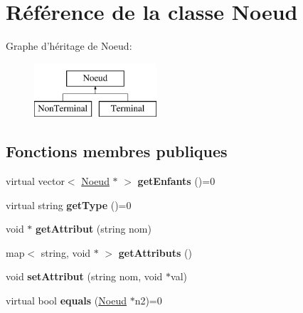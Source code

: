 \hypertarget{class_noeud}{\section{Référence de la classe Noeud}
\label{class_noeud}
}
Graphe d'héritage de Noeud\-:\begin{figure}[H]
\begin{center}
\leavevmode
\includegraphics[height=2.000000cm]{class_noeud}
\end{center}
\end{figure}
\subsection*{Fonctions membres publiques}
\begin{DoxyCompactItemize}
\item 
\hypertarget{class_noeud_ab9d96398e3e1c4767c83110463d130df}{virtual vector$<$ \hyperlink{class_noeud}{Noeud} $\ast$ $>$ {\bfseries get\-Enfants} ()=0}\label{class_noeud_ab9d96398e3e1c4767c83110463d130df}

\item 
\hypertarget{class_noeud_a23ab9345dad17e61c1891a8e5660df60}{virtual string {\bfseries get\-Type} ()=0}\label{class_noeud_a23ab9345dad17e61c1891a8e5660df60}

\item 
\hypertarget{class_noeud_ac36be22327cdf8872e8f61ed0d14d16b}{void $\ast$ {\bfseries get\-Attribut} (string nom)}\label{class_noeud_ac36be22327cdf8872e8f61ed0d14d16b}

\item 
\hypertarget{class_noeud_a235fd45cbeb5cbf2837cc69c470f3dcf}{map$<$ string, void $\ast$ $>$ {\bfseries get\-Attributs} ()}\label{class_noeud_a235fd45cbeb5cbf2837cc69c470f3dcf}

\item 
\hypertarget{class_noeud_a8b34dbe57ecb402eca805ef0bc895d66}{void {\bfseries set\-Attribut} (string nom, void $\ast$val)}\label{class_noeud_a8b34dbe57ecb402eca805ef0bc895d66}

\item 
\hypertarget{class_noeud_a5268b4941c341393d746653f9a991672}{virtual bool {\bfseries equals} (\hyperlink{class_noeud}{Noeud} $\ast$n2)=0}\label{class_noeud_a5268b4941c341393d746653f9a991672}

\end{DoxyCompactItemize}
